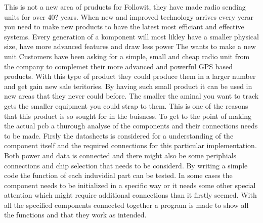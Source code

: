 
This is not a new area of pruducts for Followit, they have made radio sending units for over 40? years.
When new and improved technology arrives every yerar you need to make new products to have the latest most efficiant and effective systems. Every generation of a komponent will most likley have a smaller physical size, have more advanced features and draw less power The wants to make a new unit 
Customers have been asking for a simple, small and cheap radio unit from the company to complemet their more advanced and powerful GPS based products. With this type of product they could produce them in a larger number and get gain new sale teritories. By having such small product it can be used in new areas that they never could before. The smaller the aminal you want to track gets the smaller equipment you could strap to them. This is one of the reasons that this product is so sought for in the buisness. 
To get to the point of making the actual \gls{pcb} a thurough analyse of the components and their connections needs to be made. Firsly the datasheets is considered for a understanding of the component itself and the required connections for this particular implementation. Both power and data is connected and there might also be some periphials connections and chip selection that needs to be considerd. 
By writing a simple code the function of each induvidial part can be tested.  In some cases the component needs to be initialized in a specific way or it needs some other special attention which might require additional connections than it firstly seemed.
With all the specified components connected together a program is made to show all the functions and that they work as intended. 

\thispagestyle{empty}